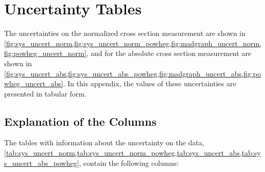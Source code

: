 \chapter{Uncertainty Tables}
\label{app:uncertainty_tables}

The uncertainties on the normalized cross section measurement are shown in
\cref{fig:sys_uncert_norm,fig:sys_uncert_norm_powheg,fig:madgraph_uncert_norm,fig:powheg_uncert_norm},
and for the absolute cross section measurement are shown in
\cref{fig:sys_uncert_abs,fig:sys_uncert_abs_powheg,fig:madgraph_uncert_abs,fig:powheg_uncert_abs}.
In this appendix, the values of these uncertainties are presented in tabular
form.

\section{Explanation of the Columns}

The tables with information about the uncertainty on the data,
\cref{tab:sys_uncert_norm,tab:sys_uncert_norm_powheg,tab:sys_uncert_abs,tab:sys_uncert_abs_powheg},
contain the following columns:

